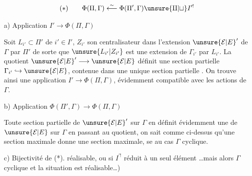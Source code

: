 \[
(*)\qquad\Phi(\Pi,\Gamma)\overset{\sim}{\longleftarrow}
\Phi(\Pi',\Gamma)\unsure{\amalg|\sqcup} I^{\prime!}
\]

a) Application $I'\longrightarrow\Phi(\Pi,\Gamma)$

Soit $L_{i'}\subset\Pi'$ de  $i'\in I'$, $Z_{i'}$ son centralisateur dans l'extension $\unsure{\mathcal E|E}'$ de $\Gamma$ par $\Pi'$
de sorte que $\unsure{L_{i'}|Z_{i'}}$ est une extension de $\Gamma_{i'}$
par $L_{i'}$. La  quotient $\unsure{\mathcal E|E}'\longrightarrow\unsure{\mathcal E|E}$
définit une section partielle $\Gamma_{i'}\hookrightarrow\unsure{\mathcal E|E}$,
contenue dans une unique section partielle 
.
On trouve ainsi une application $I'\longrightarrow\Phi(\Pi,\Gamma)$,
évidemment compatible avec les actions de $\Gamma$.

b) Application $\Phi(\Pi',\Gamma)\longrightarrow\Phi(\Pi,\Gamma)$

Toute section partielle  de $\unsure{\mathcal E|E}'$ sur $\Gamma$ en définit
évidemment une de $\unsure{\mathcal E|E}$ sur $\Gamma$ en passant au
quotient, on sait comme ci-dessus qu'une
section maximale donne une section maximale,
 se  au cas $\Gamma$ cyclique.

c) Bijectivité de (*).  
réalisable, ou si $I^{\prime!}$ réduit à un seul élément
\ldots mais alors $\Gamma$ cyclique et la situation est réalisable\ldots)
